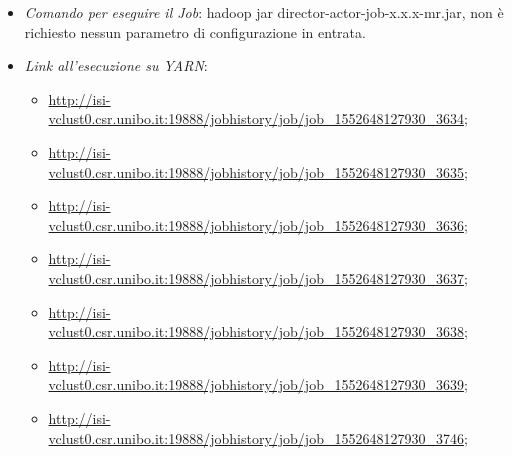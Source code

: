 \documentclass[hidelinks]{article}
\begin{document}
\begin{itemize}
	\item \textit{Comando per eseguire il Job}: hadoop jar director-actor-job-x.x.x-mr.jar, non è richiesto nessun parametro di configurazione in entrata.
	\item \textit{Link all'esecuzione su YARN}:
	\begin{itemize}
		\item \url{http://isi-vclust0.csr.unibo.it:19888/jobhistory/job/job\_1552648127930\_3634};
		\item \url{http://isi-vclust0.csr.unibo.it:19888/jobhistory/job/job\_1552648127930\_3635}; 
		\item \url{http://isi-vclust0.csr.unibo.it:19888/jobhistory/job/job\_1552648127930\_3636};
		\item \url{http://isi-vclust0.csr.unibo.it:19888/jobhistory/job/job\_1552648127930\_3637};
		\item \url{http://isi-vclust0.csr.unibo.it:19888/jobhistory/job/job\_1552648127930\_3638};
		\item \url{http://isi-vclust0.csr.unibo.it:19888/jobhistory/job/job\_1552648127930\_3639};
			\item \url{http://isi-vclust0.csr.unibo.it:19888/jobhistory/job/job_1552648127930_3746};
	\end{itemize}
	

\end{itemize}
\end{document}
